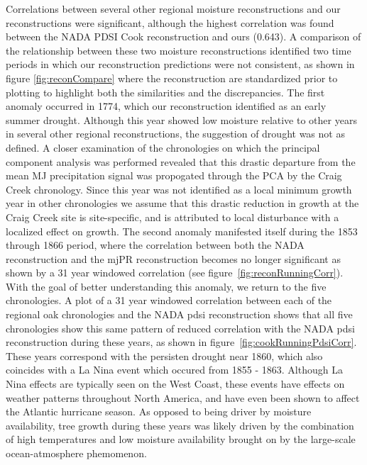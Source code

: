 \documentclass[11pt]{article}
\begin{document}
Correlations between several other regional moisture reconstructions and our reconstructions were significant, although the highest correlation was found between the NADA PDSI Cook reconstruction and ours (0.643). A comparison of the relationship between these two moisture reconstructions identified two time periods in which our reconstruction predictions were not consistent, as shown in figure \ref{fig:reconCompare} where the reconstruction are standardized prior to plotting to highlight both the similarities and the discrepancies. The first anomaly occurred in 1774, which our reconstruction identified as an early summer drought. Although this year showed low moisture relative to other years in several other regional reconstructions, the suggestion of drought was not as defined. A closer examination of the chronologies on which the principal component analysis was performed revealed that this drastic departure from the mean MJ precipitation signal was propogated through the PCA by the Craig Creek chronology. Since this year was not identified as a local minimum growth year in other chronologies we assume that this drastic reduction in growth at the Craig Creek site is site-specific, and is attributed to local disturbance with a localized effect on growth. The second anomaly manifested itself during the 1853 through 1866 period, where the correlation between both the NADA reconstruction and the mjPR reconstruction becomes no longer significant as shown by a 31 year windowed correlation (see figure~\ref{fig:reconRunningCorr}). With the goal of better understanding this anomaly, we return to the five chronologies. A plot of a 31 year windowed correlation between each of the regional oak chronologies and the NADA pdsi reconstruction shows that all five chronologies show this same pattern of reduced correlation with the NADA pdsi reconstruction during these years, as shown in figure~\ref{fig:cookRunningPdsiCorr}. These years correspond with the persisten drought near 1860, which also coincides with a La Nina event which occured from 1855 - 1863. Although La Nina effects are typically seen on the West Coast, these events have effects on weather patterns throughout North America, and have even been shown to affect the Atlantic hurricane season. As opposed to being driver by moisture availability, tree growth during these years was likely driven by the combination of high temperatures and low moisture availability brought on by the large-scale ocean-atmosphere phemomenon. %
\end{document}
